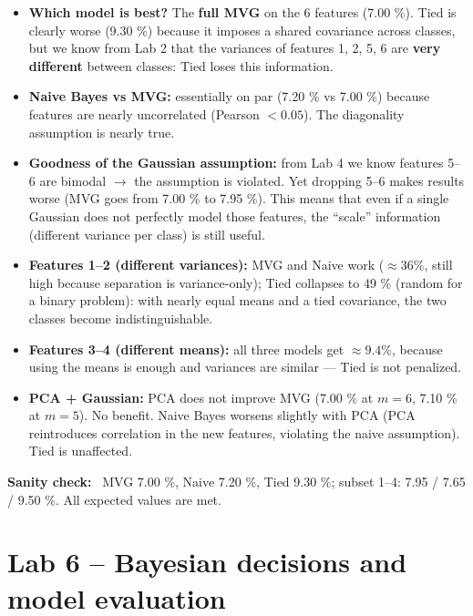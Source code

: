 \documentclass[11pt,a4paper]{article}
\begin{document}
\begin{itemize}
\item \textbf{Which model is best?} The \textbf{full MVG} on the 6
      features (7.00 \%). Tied is clearly worse (9.30 \%) because it
      imposes a shared covariance across classes, but we know from
      Lab 2 that the variances of features 1, 2, 5, 6 are
      \textbf{very different} between classes: Tied loses this
      information.

\item \textbf{Naive Bayes vs MVG:} essentially on par (7.20 \% vs
      7.00 \%) because features are nearly uncorrelated (Pearson
      $< 0.05$). The diagonality assumption is nearly true.

\item \textbf{Goodness of the Gaussian assumption:} from Lab 4 we
      know features 5--6 are bimodal $\rightarrow$ the assumption is
      violated. Yet dropping 5--6 makes results worse (MVG goes from
      7.00 \% to 7.95 \%). This means that even if a single Gaussian
      does not perfectly model those features, the ``scale''
      information (different variance per class) is still useful.

\item \textbf{Features 1--2 (different variances):} MVG and Naive work
      ($\approx 36 \%$, still high because separation is variance-only);
      Tied collapses to 49 \% (random for a binary problem): with
      nearly equal means and a tied covariance, the two classes become
      indistinguishable.

\item \textbf{Features 3--4 (different means):} all three models get
      $\approx 9.4 \%$, because using the means is enough and variances
      are similar --- Tied is not penalized.

\item \textbf{PCA + Gaussian:} PCA does not improve MVG (7.00 \% at
      $m=6$, 7.10 \% at $m=5$). No benefit. Naive Bayes worsens
      slightly with PCA (PCA reintroduces correlation in the new
      features, violating the naive assumption). Tied is unaffected.
\end{itemize}

\textbf{Sanity check:} \checkmark\ MVG 7.00 \%, Naive 7.20 \%,
Tied 9.30 \%; subset 1--4: 7.95 / 7.65 / 9.50 \%. All expected values
are met.

\section{Lab 6 -- Bayesian decisions and model evaluation}\label{sec:lab6}
\end{document}
